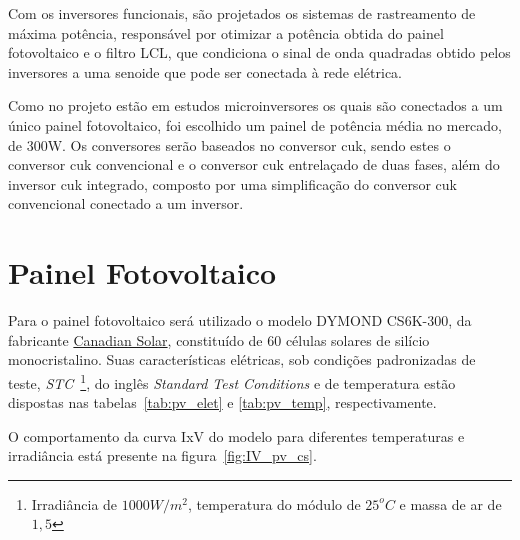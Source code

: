 \documentclass[
	12pt,				%
	openany,
	onseside,
	a4paper,			%
	english,			%
	french,				%
	spanish,			%
	brazil,				%
	]{abntex2}
\begin{document}
Com os inversores funcionais, são projetados os sistemas de rastreamento de máxima potência, responsável por otimizar a potência obtida do painel fotovoltaico e o filtro LCL, que condiciona o sinal de onda quadradas obtido pelos inversores a uma senoide que pode ser conectada à rede elétrica.

Como no projeto estão em estudos microinversores os quais são conectados a um único painel fotovoltaico, foi escolhido um painel de potência média no mercado, de 300W. Os conversores serão baseados no conversor cuk, sendo estes o conversor cuk convencional e o conversor cuk entrelaçado de duas fases, além do inversor cuk integrado, composto por uma simplificação do conversor cuk convencional conectado a um inversor.

\section{Painel Fotovoltaico}

Para o painel fotovoltaico será utilizado o modelo DYMOND CS6K-300, da fabricante \href{https://www.canadiansolar.com/en}{Canadian Solar}, constituído de 60 células solares de silício monocristalino. Suas características elétricas, sob condições padronizadas de teste, \emph{STC}~\footnote{\label{foot_:STC} Irradiância de $1000W/m^2$, temperatura do módulo de $25^oC$ e massa de ar de $1,5$}, do inglês \textit{Standard Test Conditions} e de temperatura estão dispostas nas tabelas~\ref{tab:pv_elet} e \ref{tab:pv_temp}, respectivamente.

O comportamento da curva IxV do modelo para diferentes temperaturas e irradiância está presente na figura~\ref{fig:IV_pv_cs}. 
\end{document}
